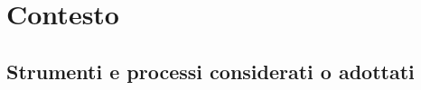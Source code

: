 \chapter{Contesto}
\label{chap:contesto}
    \section{Strumenti e processi considerati o adottati}
    \label{sec:strumenti_processi}